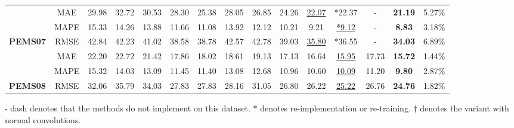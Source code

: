\documentclass{article}
\begin{document}
\begin{table*}[h]
\begin{threeparttable}
{\begin{tabular}{c|c|c|c|c|c|c|c|c|c|c|c|c|c|c}
                                    & MAE                                & 29.98 & 32.72 & 30.53 & 28.30 & 25.38 & 28.05     & 26.85        & 24.26  & {\color[RGB]{0, 100, 148} \underline{22.07}}                                      & *22.37 & -     & \textbf{21.19} & {\color[RGB]{230, 57, 70}  5.27\%}  \\ & MAPE                               & 15.33 & 14.26 & 13.88 & 11.66 & 11.08 & 13.92     & 12.12        & 10.21  & 9.21                                        & {\color[RGB]{0, 100, 148} \underline{ *9.12}}  & -     & \textbf{8.83}  & {\color[RGB]{230, 57, 70}  3.18\%}  \\ \multirow{-3}{*}{\textbf{PEMS07}}   & RMSE                               & 42.84 & 42.23 & 41.02 & 38.58 & 38.78 & 42.57     & 42.78        & 39.03  &{\color[RGB]{0, 100, 148} \underline{35.80}}                                       & *36.55 & -     & \textbf{34.03} & {\color[RGB]{230, 57, 70}  6.89\%}  \\ \hline
                                    & MAE                                & 22.20 & 22.72 & 21.42 & 17.86 & 18.02 & 18.61     & 19.13        & 17.13  & 16.64                                       & {\color[RGB]{0, 100, 148} \underline{15.95}} & 17.73 & \textbf{15.72} & {\color[RGB]{230, 57, 70} 1.44\%}  \\ & MAPE                               & 15.32 & 14.03 & 13.09 & 11.45 & 11.40 & 13.08     & 12.68        & 10.96  & 10.60                                       & {\color[RGB]{0, 100, 148} \underline{10.09}} & 11.20 & \textbf{9.80}  & {\color[RGB]{230, 57, 70}  2.87\%}  \\ \multirow{-3}{*}{\textbf{PEMS08}}   & RMSE                               & 32.06 & 35.79 & 34.03 & 27.83 & 27.83 & 28.16     & 31.05        & 26.80  & 26.22                                       & {\color[RGB]{0, 100, 148} \underline{25.22}} & 26.76 & \textbf{24.76} & {\color[RGB]{230, 57, 70}  1.82\%}  \\ \hline
\end{tabular}}
\begin{tablenotes} \tiny
		\item  - dash denotes that the methods do not implement on this dataset. \hspace{2pt} $*$ denotes re-implementation or re-training. \hspace{2pt} $\dagger$ denotes the variant with normal convolutions. \end{tablenotes} 

\end{threeparttable} \label{tab:traffic}
\end{table*}
\end{document}
